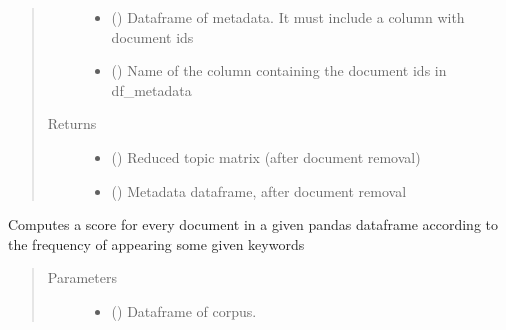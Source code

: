 \documentclass[letterpaper,10pt,english]{sphinxmanual}
\begin{document}
\begin{fulllineitems}
\begin{fulllineitems}
\begin{quote}
\begin{description}
\begin{itemize}
\item {} 
\sphinxAtStartPar
{} () \textendash{} Dataframe of metadata. It must include a column with document ids

\item {} 
\sphinxAtStartPar
{} () \textendash{} Name of the column containing the document ids in df\_metadata

\end{itemize}

\item[{Returns}] \leavevmode
\sphinxAtStartPar
\begin{itemize}
\item {} 
\sphinxAtStartPar
{} () \textendash{} Reduced topic matrix (after document removal)

\item {} 
\sphinxAtStartPar
{} () \textendash{} Metadata dataframe, after document removal

\end{itemize}


\end{description}\end{quote}

\end{fulllineitems}


\begin{fulllineitems}
\label{\detokenize{dc_preprocessor:src.domain_classifier.preprocessor.CorpusDFProcessor.score_by_keyword_count}}
\sphinxAtStartPar
Computes a score for every document in a given pandas dataframe
according to the frequency of appearing some given keywords
\begin{quote}\begin{description}
\item[{Parameters}] \leavevmode\begin{itemize}
\item {} 
\sphinxAtStartPar
{} () \textendash{} Dataframe of corpus.


\end{itemize}
\end{description}
\end{quote}
\end{fulllineitems}
\end{fulllineitems}
\end{document}
